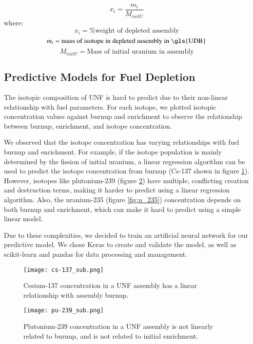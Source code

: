 \begin{equation}
x_i = \frac{m_i}{M_{initU}}
\end{equation}
where:
\[
x_i = \text{\% weight of depleted assembly}
\]
\[
m_i = \text{mass of isotope in depleted assembly in \gls{UDB}}
\]
\[
M_{initU} = \text{Mass of initial uranium in assembly}
\]


\subsection{Predictive Models for Fuel Depletion}

The isotopic composition of \gls{UNF} is hard to predict due to their
non-linear relationship with fuel parameters. For each
isotope, we plotted isotopic concentration values against
burnup and enrichment to observe the relationship between
burnup, enrichment, and isotope concentration.

We observed that the isotope concentration has varying
relationships with fuel burnup and enrichment.
For example, if the isotope population is mainly determined by
the fission of initial uranium, a linear regression algorithm
can be used to predict the isotope concentration from burnup
(Cs-137 shown in figure \ref{fig:cs_137}).
However, isotopes like plutonium-239 (figure \ref{fig:pu_239}) have multiple, conflicting creation
and destruction terms, making it harder to predict using a
linear regression algorithm. Also, the uranium-235 (figure \ref{fig:u_235}) concentration
depends on both burnup and enrichment, which can make it
hard to predict using a simple linear model.

Due to these complexities, we decided to train an artificial
neural network for our predictive model. We chose
Keras to create and validate the model, as well as scikit-learn
and pandas for data processing and management.

\begin{figure}
    \centering
    \texttt{[image: cs-137\_sub.png]}
    \caption{Cesium-137 concentration in a \gls{UNF} assembly
             has a linear relationship with assembly burnup.}
    \label{fig:cs_137}
\end{figure}

\begin{figure}
    \centering
    \texttt{[image: pu-239\_sub.png]}
    \caption{Plutonium-239 concentration in a \gls{UNF} assembly
             is not linearly related to burnup, and is
             not related to initial enrichment.}
    \label{fig:pu_239}
\end{figure}


